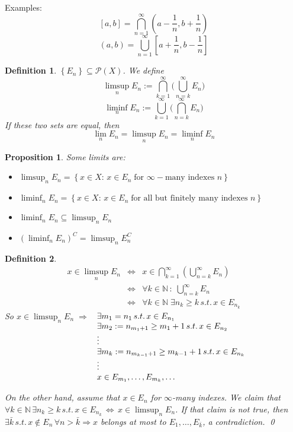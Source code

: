 \documentclass[a4paper,12pt]{article}
\theoremstyle{break}
\newtheorem{proposition}{Proposition}[section]
\newtheorem{definition}{Definition}[section]
\numberwithin{equation}{section}
\begin{document}
Examples:
\[
    [a,b] = \bigcap_{n = 1}^{\infty} (a - \frac{1}{n}, b + \frac{1}{n}) 
\]
\[
    (a,b) = \bigcup_{n = 1}^{\infty}[a + \frac{1}{n}, b - \frac{1}{n}]
\]
\begin{definition}
    \(\left\lbrace E_n \right\rbrace \subseteq \mathcal{P}(X)\). We define 
    \[
        \limsup_{n} E_n := \bigcap_{k = 1}^{\infty} \bigl(\bigcup_{n = k}^{\infty} E_n\bigr)
    \]
    \[
        \liminf_{n} E_n := \bigcup_{k = 1}^{\infty} \bigl(\bigcap_{n = k}^{\infty} E_n\bigr)
    \]
    If these two sets are equal, then 
    \[
        \lim_n E_n = \limsup_n E_n = \liminf_n E_n
    \]
\end{definition}
\begin{proposition}
    Some limits are:
    \begin{itemize}
        \item \(\limsup_n E_n = \left\lbrace x \in X :\, x \in E_n \; \mbox{for }\infty-\mbox{many indexes }n \right\rbrace\)
        \item \(\liminf_n E_n = \left\lbrace x \in X :\, x \in E_n \; \mbox{for all but finitely many indexes }n \right\rbrace\)
        \item \(\liminf_n E_n \subseteq \limsup_n E_n\)
        \item \(\left( \liminf_n E_n\right)^C = \limsup_n E_n^C\) 
    \end{itemize}
\end{proposition}
\begin{definition}
    
    \[
    \begin{array}{ccc}
        x \in \limsup_n E_n & \Longleftrightarrow & x \in \bigcap_{k = 1}^{\infty} \left(\bigcup_{n = k}^{\infty} E_n\right) \\
        & \Longleftrightarrow & \forall k \in \mathbb{N} \, : \; \bigcup_{n = k}^{\infty} E_n \\
        & \Longleftrightarrow &  \forall k \in \mathbb{N} \; \exists n_k \geq k \, s.t. \, x \in E_{n_k}
        
    \end{array}
\]
So \(x \in \limsup_n E_n \; \Longrightarrow\) \(\begin{array}[t]{l}
    \exists m_1 = n_1 \, s.t. \, x \in E_{n_1} \\
    \exists m_2 := n_{m_1 + 1} \geq m_1 + 1 \, s.t. \, x \in E_{n_2} \\
    \vdots \\
    \exists m_k := n_{m_{k-1} + 1} \geq m_{k-1} + 1 \, s.t. \, x \in E_{n_k} \\
    \vdots \\
    x \in E_{m_1}, \ldots, E_{m_k}, \ldots 
\end{array}
\)

On the other hand, assume that \(x \in E_n\) for \(\infty\)-many indexes.
We claim that \(\forall k \in \mathbb{N} \, \exists n_k \geq k \, s.t. \, x \in E_{n_k} \, \Longleftrightarrow \, x \in \limsup_n E_n\). 
If that claim is not true, then \(\exists \bar{k} \, s.t. \, x \not \in E_n \, \forall n > \bar{k} \Longrightarrow x\) belongs at most to \(E_1, \ldots, E_{\bar{k}}\), a contradiction. 
\qed
\end{definition}
\end{document}
